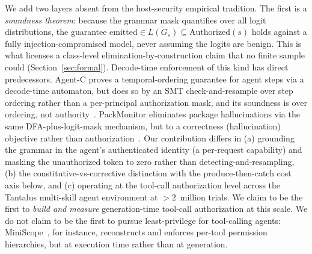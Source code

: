 We add two layers absent from the host-security empirical tradition. The first is a \emph{soundness theorem}: because the grammar mask quantifies over all logit distributions, the guarantee \(\textrm{emitted} \in L(G_s) \subseteq \mathrm{Authorized}(s)\) holds against a fully injection-compromised model, never assuming the logits are benign. This is what licenses a class-level elimination-by-construction claim that no finite sample could (Section~\ref{sec:formal}). Decode-time enforcement of this kind has direct predecessors. Agent-C proves a temporal-ordering guarantee for agent steps via a decode-time automaton, but does so by an SMT check-and-resample over step ordering rather than a per-principal authorization mask, and its soundness is over ordering, not authority~\cite{agentc2025}. PackMonitor eliminates package hallucinations via the same DFA-plus-logit-mask mechanism, but to a correctness (hallucination) objective rather than authorization~\cite{packmonitor2026}. Our contribution differs in (a) grounding the grammar in the agent's authenticated identity (a per-request capability) and masking the unauthorized token to zero rather than detecting-and-resampling, (b) the constitutive-vs-corrective distinction with the produce-then-catch cost axis below, and (c) operating at the tool-call authorization level across the Tantalus multi-skill agent environment at \({>}2\)~million trials. We claim to be the first to \emph{build and measure} generation-time tool-call authorization at this scale. We do not claim to be the first to pursue least-privilege for tool-calling agents: MiniScope~\cite{miniscope2025}, for instance, reconstructs and enforces per-tool permission hierarchies, but at execution time rather than at generation.

